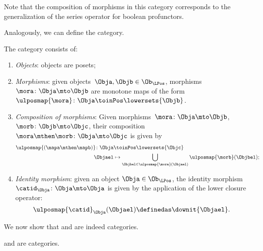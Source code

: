 \begin{remark}
    Note that the composition of morphisms in this category corresponds to the generalization of the series operator for boolean profunctors.
\end{remark}

Analogously, we can define the \LPos category.
\begin{definition}
    \label{def:lpos_cat}
    The category \LPos consists of:
    \begin{enumerate}
        \item \emph{Objects}: objects are posets;
        \item \emph{Morphisms}: given objects~$\Obja,\Objb\in \Ob_{\LPos}$, morphisms~$\mora\colon \Obja\mto \Objb$ are monotone maps of the form~$\ulposmap{\mora} \colon \Obja \toinPos \lowersets{\Objb}$.
        \item \emph{Composition of morphisms}: Given morphisms~$\mora \colon \Obja \mto \Objb$,~$\morb \colon \Objb\mto \Objc$, their composition~$\mora\mthen \morb\colon \Obja\mto \Objc$ is given by
              \begin{equation}
                  \begin{aligned}
                      \ulposmap{(\mapa \mthen \mapb)} \colon \Obja & \toinPos \lowersets{\Objc}                                                        \\
                      \Objael                                      & \mapsto \bigcup_{\Objbel\in \ulposmap{\mora} (\Objael)}\ulposmap{\morb}(\Objbel);
                  \end{aligned}
              \end{equation}
        \item \emph{Identity morphism}: given an object $\Obja\in \Ob_{\LPos}$, the identity morphism~$\catid_\Obja \colon \Obja \mto \Obja$ is given by the application of the lower closure operator:
              \begin{equation}
                  \ulposmap{\catid}_\Obja(\Objael)\definedas \downit\{\Objael\}.
              \end{equation}
    \end{enumerate}
\end{definition}

We now show that \UPos and \LPos are indeed categories.

\begin{lemma}
    \label{lem:upos_lpos_cats}
    \UPos and \LPos are categories.
\end{lemma}

